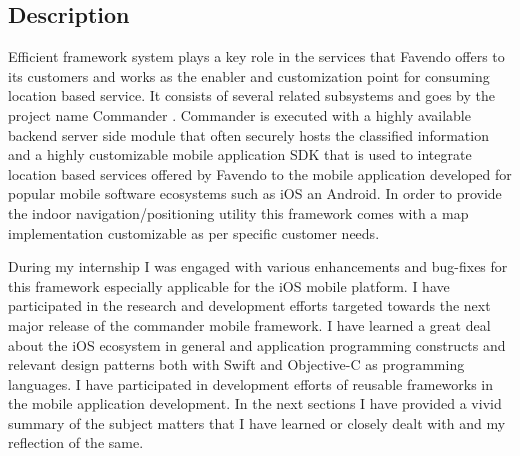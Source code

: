 \subsection{Description}
Efficient framework system plays a key role in the services that Favendo offers to its customers and works as the enabler and customization point for consuming location based service. It consists of several related subsystems and goes by the project name Commander \cite{commanderfavendo}. Commander is executed with a highly available backend server side module that often securely hosts the classified information and a highly customizable mobile application SDK that is used to integrate location based services offered by Favendo to the mobile application developed for popular mobile software ecosystems such as iOS an Android. In order to provide the indoor navigation/positioning utility this framework comes with a map implementation customizable as per specific customer needs.

\par During my internship I was engaged with various enhancements and bug-fixes for this framework especially applicable for the iOS mobile platform. I have participated in the research and development efforts targeted towards the next major release of the commander mobile framework. I have learned a great deal about the iOS ecosystem in general and application programming constructs and relevant design patterns both with Swift and Objective-C as programming languages. I have participated in development efforts of reusable frameworks in the mobile application development. In the next sections I have provided a vivid summary of the subject matters that I have learned or closely dealt with and my reflection of the same.
